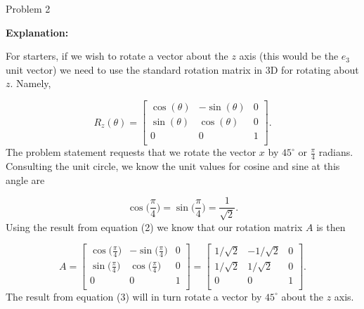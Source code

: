 \begin{problem}{Problem 2}
\begin{Highlight}[Solution]
        \noindent \textbf{Explanation:} \vspace*{1em}

        For starters, if we wish to rotate a vector about the $z$ axis (this would be the $e_{3}$ unit vector) we need to use the standard rotation matrix in 3D for rotating about $z$. Namely,

        \setcounter{equation}{0}
        \begin{equation}
            R_{z}(\theta) = 
            \begin{bmatrix}
                \cos{(\theta)} & -\sin{(\theta)} & 0 \\
                \sin{(\theta)} & \cos{(\theta)} & 0 \\
                0 & 0 & 1 \\
            \end{bmatrix}.
        \end{equation}
        The problem statement requests that we rotate the vector $x$ by $45^{\circ}$ or $\frac{\pi}{4}$ radians. Consulting the unit circle, we know the unit values for cosine and sine at this angle are

        \begin{equation}
            \cos{\Big(\frac{\pi}{4}\Big)} = \sin{\Big(\frac{\pi}{4}\Big)} = \frac{1}{\sqrt{2}}.
        \end{equation}
        Using the result from equation (2) we know that our rotation matrix $A$ is then

        \begin{equation}
            A = 
            \begin{bmatrix}
                \cos{\Big(\frac{\pi}{4}\Big)} & -\sin{\Big(\frac{\pi}{4}\Big)} & 0 \\
                \sin{\Big(\frac{\pi}{4}\Big)} & \cos{\Big(\frac{\pi}{4}\Big)} & 0 \\
                0 & 0 & 1 \\
            \end{bmatrix}
            = 
            \begin{bmatrix}
                1 / \sqrt{2} & -1 / \sqrt{2} & 0 \\
                1 / \sqrt{2} & 1 / \sqrt{2} & 0 \\
                0 & 0 & 1 \\
            \end{bmatrix}.
        \end{equation}
        The result from equation (3) will in turn rotate a vector by $45^{\circ}$ about the $z$ axis.
    \end{Highlight}
\end{problem}

